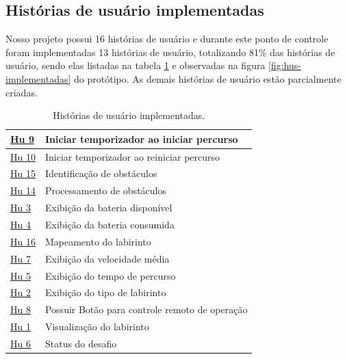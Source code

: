 \subsection{Histórias de usuário implementadas}

Nosso projeto possui 16 histórias de usuário e durante este ponto de controle foram implementadas 13 histórias de usuário, totalizando 81\% das histórias de usuário, sendo elas listadas na tabela \ref{tab:historias} e observadas na figura \ref{fig:hus-implementadas} do protótipo. As demais histórias de usuário estão parcialmente criadas.

\begin{table}[H]
    \centering
    \scriptsize
    \caption{Histórias de usuário implementadas.}
    \label{tab:historias}
    \begin{tabular}{|l|l|}
    \hline
        \href{https://github.com/fcte-pi1/2026.1_PI1_Grupo01_Bruno/issues/246}{Hu 9 }  & Iniciar temporizador ao iniciar percurso \\ \hline
        \href{https://github.com/fcte-pi1/2026.1_PI1_Grupo01_Bruno/issues/247}{Hu 10}  & Iniciar temporizador ao reiniciar percurso \\ \hline
        \href{https://github.com/fcte-pi1/2026.1_PI1_Grupo01_Bruno/issues/252}{Hu 15}   & Identificação de obstáculos  \\ \hline
        \href{https://github.com/fcte-pi1/2026.1_PI1_Grupo01_Bruno/issues/251}{Hu 14}   & Processamento de obstáculos \\ \hline
        \href{https://github.com/fcte-pi1/2026.1_PI1_Grupo01_Bruno/issues/232}{Hu 3 }  & Exibição da bateria disponível \\ \hline
        \href{https://github.com/fcte-pi1/2026.1_PI1_Grupo01_Bruno/issues/233}{Hu 4 } & Exibição da bateria consumida  \\ \hline
        \href{https://github.com/fcte-pi1/2026.1_PI1_Grupo01_Bruno/issues/253}{Hu 16}   & Mapeamento do labirinto \\ \hline
        \href{https://github.com/fcte-pi1/2026.1_PI1_Grupo01_Bruno/issues/236}{Hu 7}   & Exibição da velocidade média \\ \hline
        \href{https://github.com/fcte-pi1/2026.1_PI1_Grupo01_Bruno/issues/234}{Hu 5}   & Exibição do tempo de percurso \\ \hline
        \href{https://github.com/fcte-pi1/2026.1_PI1_Grupo01_Bruno/issues/231}{Hu 2}   & Exibição do tipo de labirinto \\ \hline
        \href{https://github.com/fcte-pi1/2026.1_PI1_Grupo01_Bruno/issues/237}{Hu 8}   & Possuir Botão para controle remoto de operação \\ \hline
        \href{https://github.com/fcte-pi1/2026.1_PI1_Grupo01_Bruno/issues/230}{Hu 1}   & Visualização do labirinto \\ \hline
        \href{https://github.com/fcte-pi1/2026.1_PI1_Grupo01_Bruno/issues/235}{Hu 6}   & Status do desafio \\ \hline
    \end{tabular}
\end{table}

